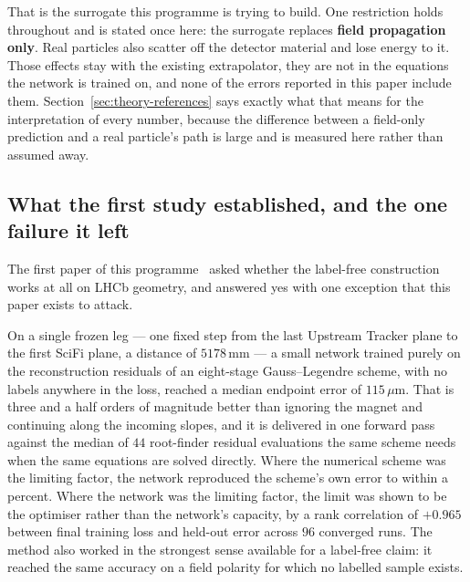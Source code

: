 \documentclass[11pt,a4paper]{article}
\newcommand{\um}{\ensuremath{\,\mu\mathrm{m}}}
\newcommand{\mm}{\ensuremath{\,\mathrm{mm}}}
\begin{document}
That is the surrogate this programme is trying to build. One restriction holds
throughout and is stated once here: the surrogate replaces \textbf{field
propagation only}. Real particles also scatter off the detector material and
lose energy to it. Those effects stay with the existing extrapolator, they are
not in the equations the network is trained on, and none of the errors reported
in this paper include them. Section~\ref{sec:theory-references} says exactly
what that means for the interpretation of every number, because the difference
between a field-only prediction and a real particle's path is large and is
measured here rather than assumed away.

\subsection{What the first study established, and the one failure it left}
\label{sec:intro-paper1}

The first paper of this programme~\citep{scriven2026lhcb1} asked whether the
label-free construction works at all on LHCb geometry, and answered yes with
one exception that this paper exists to attack.

On a single frozen leg --- one fixed step from the last Upstream Tracker plane
to the first SciFi plane, a distance of $5178\mm$ --- a small network trained
purely on the reconstruction residuals of an eight-stage Gauss--Legendre
scheme, with no labels anywhere in the loss, reached a median endpoint error of
$115\um$. That is three and a half orders of magnitude better than ignoring the
magnet and continuing along the incoming slopes, and it is delivered in one
forward pass against the median of $44$ root-finder residual evaluations the
same scheme needs when the same equations are solved directly. Where the
numerical scheme was the limiting factor, the network reproduced the scheme's
own error to within a percent. Where the network was the limiting factor, the
limit was shown to be the optimiser rather than the network's capacity, by a
rank correlation of $+0.965$ between final training loss and held-out error
across $96$ converged runs. The method also worked in the strongest sense
available for a label-free claim: it reached the same accuracy on a field
polarity for which no labelled sample exists.
\end{document}
